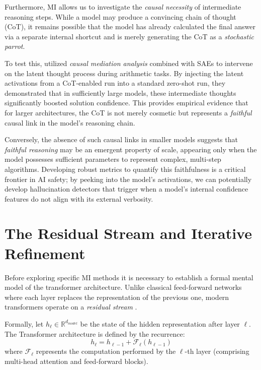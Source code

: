 Furthermore, MI allows us to investigate the \emph{causal necessity} of intermediate reasoning steps. While a model may produce a convincing chain of thought (CoT), it remains possible that the model has already calculated the final answer via a separate internal shortcut and is merely generating the CoT as a \emph{stochastic parrot}. 

To test this, \citet{chen2025does} utilized \emph{causal mediation analysis} combined with SAEs to intervene on the latent thought process during arithmetic tasks. By injecting the latent activations from a CoT-enabled run into a standard zero-shot run, they demonstrated that in sufficiently large models, these intermediate thoughts significantly boosted solution confidence. This provides empirical evidence that for larger architectures, the CoT is not merely cosmetic but represents a \emph{faithful} causal link in the model's reasoning chain.

Conversely, the absence of such causal links in smaller models suggests that \emph{faithful reasoning} may be an emergent property of scale, appearing only when the model possesses sufficient parameters to represent complex, multi-step algorithms. Developing robust metrics to quantify this faithfulness is a critical frontier in AI safety; by peeking into the model's activations, we can potentially develop hallucination detectors that trigger when a model's internal confidence features do not align with its external verbosity.

\section{The Residual Stream and Iterative Refinement} \label{residualstream}

Before exploring specific MI methods it is necessary to establish a formal mental model of the transformer architecture. Unlike classical feed-forward networks where each layer replaces the representation of the previous one, modern transformers operate on a \textit{residual stream} \citep{elhage2021mathematical}.

Formally, let $h_\ell \in \mathbb{R}^{d_{model}}$ be the state of the hidden representation after layer $\ell$. The Transformer architecture is defined by the recurrence:
\begin{equation}
    h_\ell = h_{\ell-1} + \mathcal{F}_\ell(h_{\ell-1})
\end{equation}
where $\mathcal{F}_\ell$ represents the computation performed by the $\ell$-th layer (comprising multi-head attention and feed-forward blocks). 


